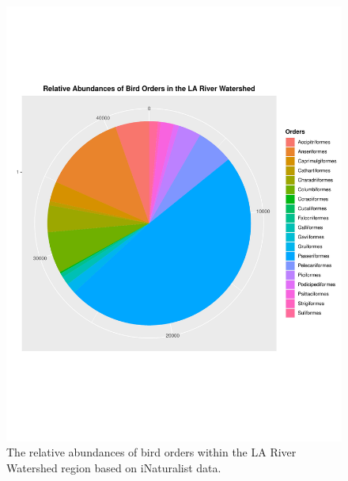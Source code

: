 \documentclass[letterpaper]{article}
\begin{document}
\newpage

\begin{figure}[h]
	\centering
	\includegraphics[width=0.6\paperwidth]{pie_chart}
	\caption{The relative abundances of bird orders within the LA River Watershed region based on iNaturalist data.\label{fig:pie}}
\end{figure}






\end{document}
